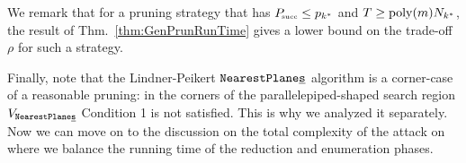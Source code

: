 We remark that for a pruning strategy that has $P\mkern-4mu_{\mbox{\tiny succ}} \leq p_{k^*}$ and $T \geq \mathrm{poly}(m) N_{k^*}$, the result of Thm.~\ref{thm:GenPrunRunTime} gives a lower bound on the trade-off $\rho$ for such a strategy. 

Finally, note that the Lindner-Peikert $\texttt{NearestPlane\underline{s}}$ algorithm is a corner-case of a reasonable pruning: in the corners of the parallelepiped-shaped search region $V_{\texttt{NearestPlane\underline{s}}}$ Condition 1 is not satisfied. This is why we analyzed it separately. Now we can move on to the discussion on the total complexity of the \BDD attack on \LWE where we balance the running time of the reduction and enumeration phases.